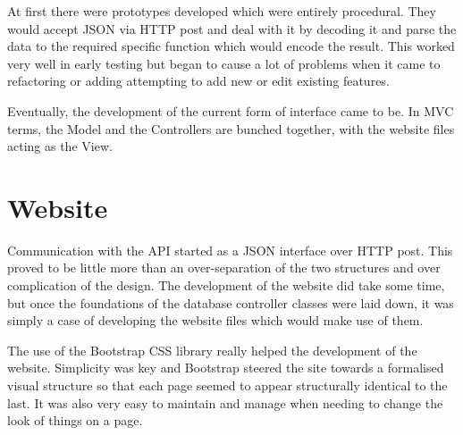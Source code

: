 	At first there were prototypes developed which were entirely procedural. They would accept JSON via HTTP post and deal with it by decoding it and parse the data to the required specific function which would encode the result. This worked very well in early testing but began to cause a lot of problems when it came to refactoring or adding attempting to add new or edit existing features.
	
	Eventually, the development of the current form of interface came to be. In MVC terms, the Model and the Controllers are bunched together, with the website files acting as the View.
	
\section{Website}
	Communication with the API started as a JSON interface over HTTP post. This proved to be little more than an over-separation of the two structures and over complication of the design. The development of the website did take some time, but once the foundations of the database controller classes were laid down, it was simply a case of developing the website files which would make use of them.
	
	The use of the Bootstrap CSS library really helped the development of the website. Simplicity was key and Bootstrap steered the site towards a formalised visual structure so that each page seemed to appear structurally identical to the last. It was also very easy to maintain and manage when needing to change the look of things on a page.
